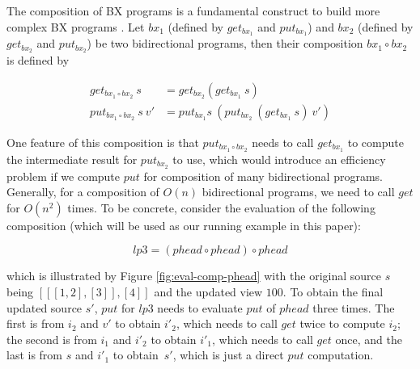 The composition of BX programs is a fundamental construct to build more complex BX programs \cite{Bohannon06relationallenses:, Bohannon:2008:BRL:1328438.1328487}. Let $bx_1$ (defined by $get_{bx_1}$ and $put_{bx_1}$) and $bx_2$ (defined by $get_{bx_2}$ and $put_{bx_2}$) be two bidirectional programs, then their composition $bx_1 \circ bx_2$ is defined by

\minusvspace
\begin{align}
get_{bx_1 \circ bx_2}~s &= get_{bx_2} (get_{bx_1}~s)\\
put_{bx_1 \circ bx_2}~s~v' &= put_{bx_1} s~(put_{bx_2}~ (get_{bx_1}~s)~v')
\end{align}
\minusvspace

\noindent One feature of this composition is that $put_{bx_1 \circ bx_2}$ needs to call $get_{bx_1}$ to compute the intermediate result for $put_{bx_2}$ to use, which would introduce an efficiency problem if we compute $put$ for composition of many bidirectional programs. Generally, for a composition of $O(n)$ bidirectional programs, we need to call $get$ for $O(n^2)$ times. To be concrete, consider the evaluation of the following composition (which will be used as our running example in this paper):

\minusvspacetwo
\[
lp3 = (phead \circ phead) \circ phead
\]
\minusvspacetwo

\noindent which is illustrated by Figure \ref{fig:eval-comp-phead} with the original source $s$ being ${[[[1,2],[3]],[4]]}$ and the updated view ${100}$.
To obtain the final updated source $s'$, $put$ for $lp3$ needs to evaluate $put$ of $phead$ three times. The first is from $i_2$ and $v'$ to obtain $i'_2$, which needs to call $get$ twice to compute $i_2$; the second is from $i_1$ and $i'_2$ to obtain $i'_1$, which needs to call $get$ once, and the last is from $s$ and $i'_1$ to obtain~$s'$, which is just a direct $put$ computation.



